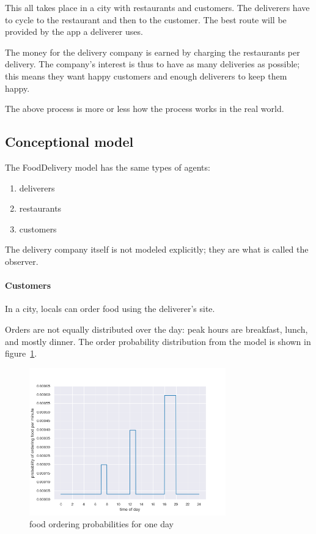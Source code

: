 This all takes place in a city with restaurants and customers.
The deliverers have to cycle to the restaurant and then to the customer.
The best route will be provided by the app a deliverer uses.

The money for the delivery company is earned by charging the restaurants per delivery.
The company's interest is thus to have as many deliveries as possible; this means they want happy customers and enough deliverers to keep them happy.

The above process is more or less how the process works in the real world.

\subsection{Conceptional model}\label{subsec:conceptional-model}
The FoodDelivery model has the same types of agents:
\begin{enumerate}
\item deliverers
\item restaurants
\item customers
\end{enumerate}

The delivery company itself is not modeled explicitly; they are what is called the observer.

\paragraph{Customers}
In a city, locals can order food using the deliverer's site.

Orders are not equally distributed over the day: peak hours are breakfast, lunch, and mostly dinner.
The order probability distribution from the model is shown in figure~\ref{fig:food_ordering_distribution}.

\begin{figure}
    \centering
    \includegraphics[width=8.5cm]{sections/pics/food_ordering_distribution}
    \caption{food ordering probabilities for one day}
    \label{fig:food_ordering_distribution}
\end{figure}

